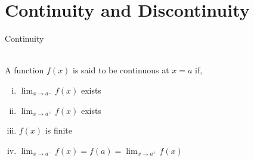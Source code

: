 \documentclass[12pt]{article}
\begin{document}
\section{Continuity and Discontinuity}

\begin{definition}{Continuity}
    
    \\ A function $f(x)$ is said to be continuous at $x=a$ if,
    \begin{enumerate}[(i)]
        \item $\lim_{x \to a^-} f(x)$ exists
        \item $\lim_{x \to a^+} f(x)$ exists
        \item $f(x)$ is finite
        \item $\lim_{x \to a^-} f(x) = f(a) = \lim_{x \to a^+} f(x)$
    \end{enumerate}
\end{definition}



    
\end{document}
